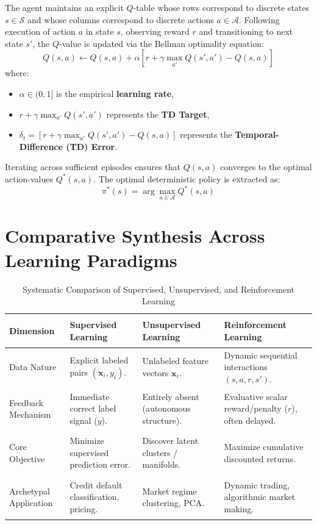 The agent maintains an explicit $Q$-table whose rows correspond to discrete states $s \in \mathcal{S}$ and whose columns correspond to discrete actions $a \in \mathcal{A}$. Following execution of action $a$ in state $s$, observing reward $r$ and transitioning to next state $s'$, the $Q$-value is updated via the Bellman optimality equation:
\begin{equation}
    Q(s, a) \leftarrow Q(s, a) + \alpha \left[ r + \gamma \max_{a'} Q(s', a') - Q(s, a) \right]
\end{equation}
where:
\begin{itemize}
    \item $\alpha \in (0, 1]$ is the empirical \textbf{learning rate},
    \item $r + \gamma \max_{a'} Q(s', a')$ represents the \textbf{TD Target},
    \item $\delta_t = \left[ r + \gamma \max_{a'} Q(s', a') - Q(s, a) \right]$ represents the \textbf{Temporal-Difference (TD) Error}.
\end{itemize}

Iterating across sufficient episodes ensures that $Q(s, a)$ converges to the optimal action-values $Q^*(s, a)$. The optimal deterministic policy is extracted as:
\begin{equation}
    \pi^*(s) = \arg\max_{a \in \mathcal{A}} Q^*(s, a)
\end{equation}

\section{Comparative Synthesis Across Learning Paradigms}

\begin{table}[!htbp]
\centering
\caption{Systematic Comparison of Supervised, Unsupervised, and Reinforcement Learning}
\label{tab:three_paradigms}
\vspace{0.2em}
\renewcommand{\arraystretch}{1.3}
\begin{tabularx}{\textwidth}{>{\bfseries\raggedright\arraybackslash}p{2.6cm}XXX}
\toprule
Dimension & Supervised Learning & Unsupervised Learning & Reinforcement Learning \\
\midrule
Data Nature & Explicit labeled pairs $(\mathbf{x}_i, y_i)$. & Unlabeled feature vectors $\mathbf{x}_i$. & Dynamic sequential interactions $(s, a, r, s')$. \\
Feedback Mechanism & Immediate correct label signal ($y$). & Entirely absent (autonomous structure). & Evaluative scalar reward/penalty ($r$), often delayed. \\
Core Objective & Minimize supervised prediction error. & Discover latent clusters / manifolds. & Maximize cumulative discounted returns. \\
Archetypal Application & Credit default classification, pricing. & Market regime clustering, PCA. & Dynamic trading, algorithmic market making. \\
\bottomrule
\end{tabularx}
\end{table}

